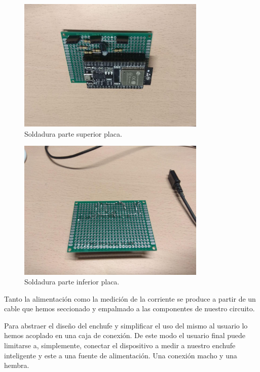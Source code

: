 \documentclass[a4paper,10pt]{article}
\begin{document}
\begin{figure}
  \centering
  \includegraphics[width=0.8\textwidth]{img/soldadura_superior.jpg}
  \caption{Soldadura parte superior placa.}\label{fig:soldado_superior}
\end{figure}

\begin{figure}
  \centering
  \includegraphics[width=0.8\textwidth]{img/soldadura_inferior.jpg}
  \caption{Soldadura parte inferior placa.}\label{fig:soldado_inferior}
\end{figure}

Tanto la alimentación como la medición de la corriente se produce a
partir de un cable que hemos seccionado y empalmado a las componentes
de nuestro circuito.

Para abstraer el diseño del enchufe y simplificar el uso del mismo al
usuario lo hemos acoplado en una caja de conexión. De este modo el
usuario final puede limitarse a, simplemente, conectar el dispositivo
a medir a nuestro enchufe inteligente y este a una fuente de
alimentación. Una conexión macho y una hembra.
\end{document}
